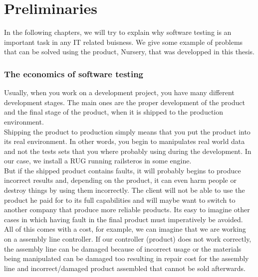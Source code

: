 \documentclass[12pt]{article}
\theoremstyle{definition}
\theoremstyle{definition}
\theoremstyle{remark}
\begin{document}
\clearpage
\part{Preliminaries}

In the following chapters, we will try to explain why software testing is an important task in any IT related buisness. We give some example of problems that can be solved using the product, Nursery, that was developped in this thesis.



\section{The economics of software testing}


Usually, when you work on a development project, you have many different development stages. The main ones are the proper development of the product and the final stage of the product, when it is shipped to the production environment.\\

Shipping the product to production simply means that you put the product into its real environment. In other words, you begin to manipulates real world data and not the tests sets that you where probably using during the development. In our case, we install a RUG running \gls{railsteros} in some engine.\\

But if the shipped product contains faults, it will probably begins to produce incorrect results and, depending on the product, it can even harm people or destroy things by using them incorrectly. The client will not be able to use the product he paid for to its full capabilities and will maybe want to switch to another company that produce more reliable products. Its easy to imagine other cases in which having fault in the final product must imperatively be avoided.\\

All of this comes with a cost, for example, we can imagine that we are working on a assembly line controller. If our controller (product) does not work correctly, the assembly line can be damaged because of incorrect usage or the materials being manipulated can be damaged too resulting in repair cost for the assembly line and incorrect/damaged product assembled that cannot be sold afterwards.\\
\end{document}
